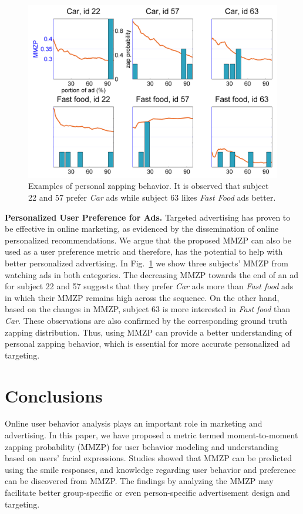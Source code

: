 \documentclass[twoside,leqno,twocolumn]{article}
\begin{document}
\begin{figure}[t]
	\centering
		\includegraphics[width=\columnwidth]{fig/adcat_id.png}
	\caption{Examples of personal zapping behavior. It is observed that subject 22 and 57 prefer \textit{Car} ads while subject 63 likes \textit{Fast Food} ads better.}
	\label{fig:adcat_id}
\end{figure}


\noindent \textbf{Personalized User Preference for Ads.} Targeted advertising has proven to be effective in online marketing, as evidenced by the dissemination of online personalized recommendations. We argue that the proposed MMZP can also be used as a user preference metric and therefore, has the potential to help with better personalized advertising. In Fig.~\ref{fig:adcat_id} we show three subjects' MMZP from watching ads in both categories. The decreasing MMZP towards the end of an ad for subject 22 and 57 suggests that they prefer \textit{Car} ads more than \textit{Fast food} ads in which their MMZP remains high across the sequence. On the other hand, based on the changes in MMZP, subject 63 is more interested in \textit{Fast food} than \textit{Car}. These observations are also confirmed by the corresponding ground truth zapping distribution. Thus, using MMZP can provide a better understanding of personal zapping behavior, which is essential for more accurate personalized ad targeting.


\section{Conclusions}

Online user behavior analysis plays an important role in marketing and advertising. In this paper, we have proposed a metric termed moment-to-moment zapping probability (MMZP) for user behavior modeling and understanding based on users' facial expressions. Studies showed that MMZP can be predicted using the smile responses, and knowledge regarding user behavior and preference can be discovered from MMZP. The findings by analyzing the MMZP may facilitate better group-specific or even person-specific advertisement design and targeting. 




\end{document}
